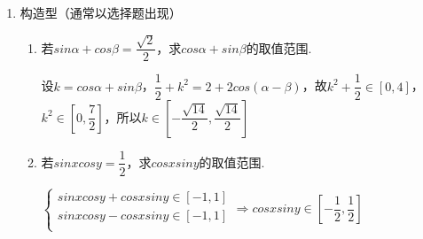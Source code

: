 \begin{enumerate}
\begin{enumerate}
\begin{jieda}
\begin{enumerate}
                当$x \neq k\pi (k \in \mathbf{Z})$时，$y = \dfrac{\dfrac{2tan\dfrac{x}{2}}{1+tan^2\dfrac{x}{2}}}{\dfrac{1-tan^2\dfrac{x}{2}}{1+tan^2\dfrac{x}{2}} - 3} = \dfrac{2tan\dfrac{x}{2}}{-2-4tan^2\dfrac{x}{2}} = -\dfrac{tan\dfrac{x}{2}}{1+2tan^2\dfrac{x}{2}}$，令$t = tan\dfrac{x}{2}, t \in \mathbf{R}$，故$y = -\dfrac{t}{1+2t^2}$
                综上，$y \in \left[-\dfrac{\sqrt{2}}{4}, \dfrac{\sqrt{2}}{4}\right]$
                \item 数形结合 \\
                $y$即点$(cosx, sinx)$到$(3, 0)$连线斜率
            \end{enumerate}
        \end{jieda}
        \item 构造型（通常以选择题出现）
        \begin{enumerate}
            \item 若$sin\alpha + cos\beta = \dfrac{\sqrt{2}}{2}$，求$cos\alpha + sin\beta$的取值范围.
            \begin{jieda}
                设$k = cos\alpha + sin\beta$，$\dfrac{1}{2}+k^2 = 2 + 2cos(\alpha - \beta)$，故$k^2 + \dfrac{1}{2} \in [0, 4]$，$k^2 \in \left[0, \dfrac{7}{2}\right]$，所以$k \in \left[-\dfrac{\sqrt{14}}{2}, \dfrac{\sqrt{14}}{2}\right]$
            \end{jieda}
            \item 若$sinx cosy = \dfrac{1}{2}$，求$cosx siny$的取值范围.
            \begin{jieda}
                $\left \{ \begin{array}{l}
                     sinxcosy + cosxsiny \in [-1, 1] \\
                     sinxcosy - cosxsiny \in [-1, 1] \\
                \end{array}\right. \Longrightarrow cosxsiny \in \left[-\dfrac{1}{2}, \dfrac{1}{2}\right]$
            \end{jieda}
        \end{enumerate}
    \end{enumerate}


\end{enumerate}
